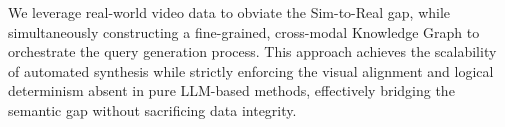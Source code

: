 We leverage real-world video data to obviate the Sim-to-Real gap, while simultaneously constructing a fine-grained, cross-modal Knowledge Graph to orchestrate the query generation process.
This approach achieves the scalability of automated synthesis while strictly enforcing the visual alignment and logical determinism absent in pure LLM-based methods, effectively bridging the semantic gap without sacrificing data integrity.
